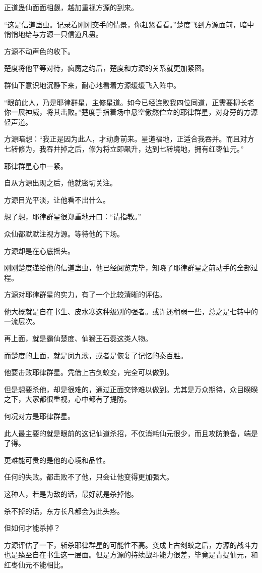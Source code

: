 \begin{this_body}
正道蛊仙面面相觑，越加重视方源的到来。

“这是信道蛊虫。记录着刚刚交手的情景，你赶紧看看。”楚度飞到方源面前，暗中悄悄地给与方源一只信道凡蛊。

方源不动声色的收下。

楚度将他平等对待，疯魔之约后，楚度和方源的关系就更加紧密。

群仙下意识地沉静下来，耐心地看着方源缓缓飞入阵中。

“眼前此人，乃是耶律群星，主修星道。如今已经连败我四位同道，正需要柳长老你一展神威，将其击败。”楚度手指着场中悬空傲然伫立的耶律群星，对身旁的方源轻声道。

方源暗想：“我正是因为此人，才动身前来。星道福地，正适合我吞并。而且对方七转修为，我吞并掉之后，修为将立即飙升，达到七转境地，拥有红枣仙元。”

耶律群星心中一紧。

自从方源出现之后，他就密切关注。

方源目光平淡，让他看不出什么。

想了想，耶律群星很郑重地开口：“请指教。”

众仙都默默注视方源。等待他的下场。

方源却是在心底摇头。

刚刚楚度递给他的信道蛊虫，他已经阅览完毕，知晓了耶律群星之前动手的全部过程。

方源对耶律群星的实力，有了一个比较清晰的评估。

他大概就是自在书生、皮水寒这种级别的强者。或许还稍弱一些，总之是七转中的一流层次。

再上面，就是霸仙楚度、仙猴王石磊这类人物。

而楚度的上面，就是凤九歌，或者是恢复了记忆的秦百胜。

他要击败耶律群星。凭借上古剑蛟变，完全可以做到。

但是想要杀他，却是很难的，通过正面交锋难以做到。尤其是万众期待，众目睽睽之下，大家都很重视，心中都有了提防。

何况对方是耶律群星。

此人最主要的就是眼前的这记仙道杀招，不仅消耗仙元很少，而且攻防兼备，端是了得。

更难能可贵的是他的心境和品性。

任何的失败。都击败不了他，只会让他变得更加强大。

这种人，若是为敌的话，最好就是杀掉他。

杀不掉的话，东方长凡都会为此头疼。

但如何才能杀掉？

方源评估了一下，斩杀耶律群星的可能性不高。变成上古剑蛟之后，方源的战斗力也是臻至自在书生这一层面。但是方源的持续战斗能力很差，毕竟是青提仙元，和红枣仙元不能相比。


\end{this_body}
